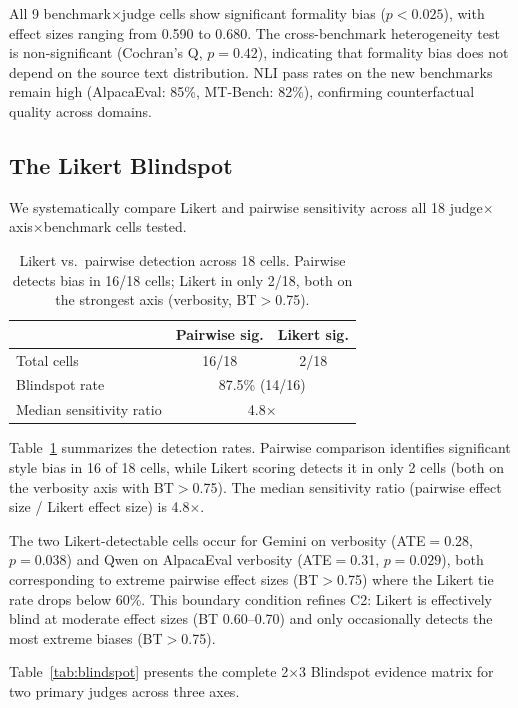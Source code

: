 \documentclass[10pt,twocolumn]{article}
\begin{document}
All 9 benchmark$\times$judge cells show significant formality bias ($p<0.025$), with effect sizes ranging from 0.590 to 0.680.
The cross-benchmark heterogeneity test is non-significant (Cochran's Q, $p=0.42$), indicating that formality bias does not depend on the source text distribution.
NLI pass rates on the new benchmarks remain high (AlpacaEval: 85\%, MT-Bench: 82\%), confirming counterfactual quality across domains.

\subsection{The Likert Blindspot}\label{sec:blindspot}

We systematically compare Likert and pairwise sensitivity across all 18 judge$\times$axis$\times$benchmark cells tested.

\begin{table}[t]
\centering
\caption{Likert vs.\ pairwise detection across 18 cells. Pairwise detects bias in 16/18 cells; Likert in only 2/18, both on the strongest axis (verbosity, BT$>$0.75).}
\label{tab:blindspot_summary}
\small
\begin{tabular}{@{}lcc@{}}
\toprule
& Pairwise sig. & Likert sig. \\
\midrule
Total cells & 16/18 & 2/18 \\
Blindspot rate & \multicolumn{2}{c}{87.5\% (14/16)} \\
Median sensitivity ratio & \multicolumn{2}{c}{4.8$\times$} \\
\bottomrule
\end{tabular}
\end{table}

Table~\ref{tab:blindspot_summary} summarizes the detection rates.
Pairwise comparison identifies significant style bias in 16 of 18 cells, while Likert scoring detects it in only 2 cells (both on the verbosity axis with BT$>$0.75).
The median sensitivity ratio (pairwise effect size / Likert effect size) is 4.8$\times$.

The two Likert-detectable cells occur for Gemini on verbosity (ATE$=$0.28, $p=0.038$) and Qwen on AlpacaEval verbosity (ATE$=$0.31, $p=0.029$), both corresponding to extreme pairwise effect sizes (BT$>$0.75) where the Likert tie rate drops below 60\%.
This boundary condition refines C2: Likert is effectively blind at moderate effect sizes (BT 0.60--0.70) and only occasionally detects the most extreme biases (BT$>$0.75).

Table~\ref{tab:blindspot} presents the complete 2$\times$3 Blindspot evidence matrix for two primary judges across three axes.
\end{document}
